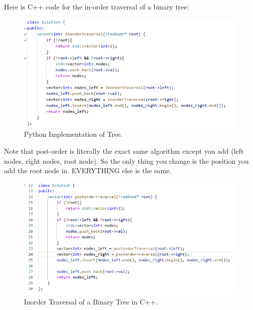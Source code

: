 \documentclass[12pt]{article}
\begin{document}
Here is C++ code for the in-order traversal of a binary tree:
\begin{figure}[H]
    \centering
    \includegraphics[width=1.0\textwidth]{./inorder.png} %
	\caption{Python Implementation of Tree.}
\end{figure}

Note that post-order is literally the exact same algorithm except you add (left nodes, right nodes, root node). So the only thing you change is the position you add the root node in. EVERYTHING else is the same.
\begin{figure}[H]
    \centering
    \includegraphics[width=1.0\textwidth]{./postorder.png} %
	\caption{Inorder Traversal of a Binary Tree in C++.}
\end{figure}
\end{document}
